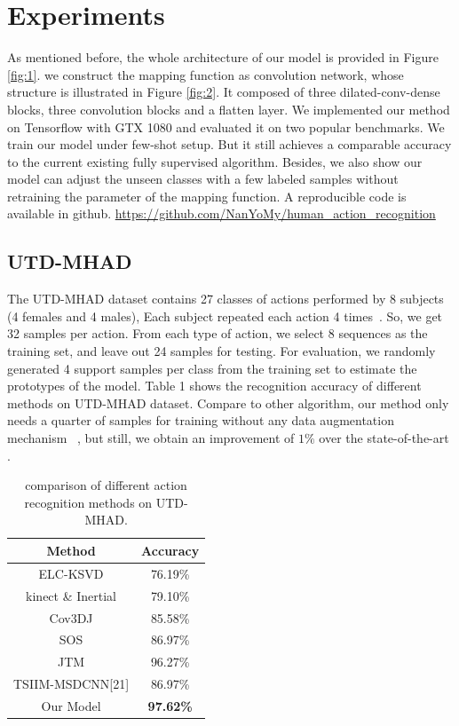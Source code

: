 \documentclass{bmvc2k}
\begin{document}
\section{Experiments}
As mentioned before, the whole architecture of our model is provided in Figure \ref{fig:1}. we construct the mapping function as convolution network, whose structure is illustrated in Figure \ref{fig:2}. It composed of three dilated-conv-dense blocks, three convolution blocks and a flatten layer. We implemented our method on Tensorflow with GTX 1080 and evaluated it on two popular benchmarks. We train our model under few-shot setup. But it still achieves a comparable accuracy to the current existing fully supervised algorithm. Besides, we also show our model can adjust the unseen classes with a few labeled samples without retraining the parameter of the mapping function. A reproducible code is available in github. \url{https://github.com/NanYoMy/human_action_recognition}

\subsection*{UTD-MHAD}
The UTD-MHAD dataset contains 27 classes of actions performed by 8 subjects (4 females and 4 males), Each subject repeated each action 4 times~\cite{chen2015utd}. So, we get 32 samples per action. From each type of action, we select 8 sequences as the training set, and leave out 24 samples for testing. For evaluation, we randomly generated 4 support samples per class from the training set to estimate the prototypes of the model. Table 1 shows the recognition accuracy of different methods on UTD-MHAD dataset. Compare to other algorithm, our method only needs a quarter of samples for training without any data augmentation mechanism ~\cite{pham2017learning,pham2017learning}, but still, we obtain an improvement of $1\%$ over the state-of-the-art .

\begin{table}[htb]
	\begin{center}		
		\begin{tabular}{|c|c|}
			\hline
			Method & Accuracy \\
			\hline\hline
			ELC-KSVD & 76.19\% \\
			kinect \& Inertial & 79.10\% \\
			Cov3DJ & 85.58\%\\
			SOS & 86.97\% \\
			JTM & 96.27\% \\
			TSIIM-MSDCNN[21] & 86.97\% \\
			Our Model & \bf{97.62\%} \\
			\hline
		\end{tabular}	
	\end{center}		
	\caption{ comparison of different action recognition methods on UTD-MHAD.}
	\label{tab:1}
\end{table}
\end{document}

